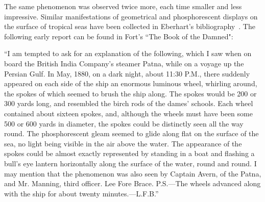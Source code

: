 The same phenomenon was observed twice more, each time smaller and less impressive.
Similar manifestations of geometrical and phosphorescent displays on the surface of tropical seas have been
collected in Eberhart's bibliography~\cite[Chapter~27]{Eberhart-I-1986Jan}. The following early report can be found
in Fort's ``The Book of the Damned"\cite[Chapter~21]{FortBotD}:
\begin{svgraybox}
``I am tempted to ask for an explanation of the following, which I saw when on board the British India Company's steamer
Patna, while on a voyage up the Persian Gulf. In May, 1880, on a dark night, about 11:30 P.M.,
there suddenly appeared on each side of the ship an enormous luminous wheel, whirling around,
the spokes of which seemed to brush the ship along.
The spokes would be 200 or 300 yards long, and resembled the birch rods of the dames' schools.
Each wheel contained about sixteen spokes, and, although the wheels must have been some 500 or 600 yards in diameter,
the spokes could be distinctly seen all the way round.
The phosphorescent gleam seemed to glide along flat on the surface of the sea, no light being visible in the air above the water.
The appearance of the spokes could be almost exactly represented by standing in a boat and flashing a bull's eye lantern
horizontally along the surface of the water, round and round. I may mention that the phenomenon was also seen by Captain Avern, of the
Patna, and Mr. Manning, third officer. Lee Fore Brace. P.S.---The wheels advanced along with the ship for about twenty minutes.---L.F.B.''
\end{svgraybox}

